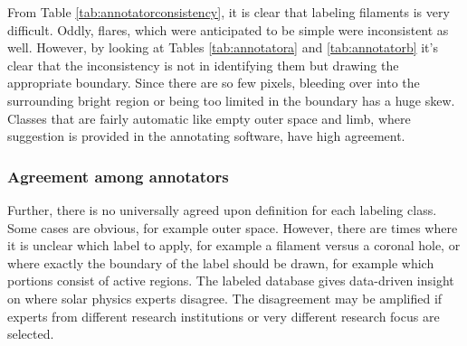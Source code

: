 \documentclass[twoside]{report}
\begin{document}
From Table \ref{tab:annotatorconsistency}, it is clear that labeling filaments is very difficult. Oddly, flares, which were anticipated to be simple were inconsistent as well. However, by looking at Tables \ref{tab:annotatora} and \ref{tab:annotatorb} it's clear that the inconsistency is not in  identifying them but drawing the appropriate boundary. Since there are so few pixels, bleeding over into the surrounding bright region or being too limited in the boundary has a huge skew. Classes that are fairly automatic like empty outer space and limb, where suggestion is provided in the annotating software, have high agreement. 

\subsubsection{Agreement among annotators} \label{sec:agreement}
Further, there is no universally agreed upon definition for each labeling class. Some cases are obvious, for example outer space. However, there are times where it is unclear which label to apply, for example a filament versus a coronal hole, or where exactly the boundary of the label should be drawn, for example which portions consist of active regions. The labeled database gives data-driven insight on where solar physics experts disagree. The disagreement may be amplified if experts from different research institutions or very different research focus are selected. 
\end{document}
